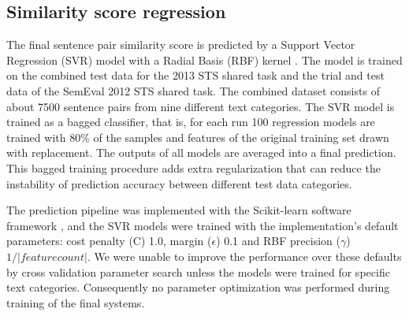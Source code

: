 
\subsection{Similarity score regression}
\label{sec:regression}

The final sentence pair similarity score is predicted by a Support Vector Regression (SVR) model with a Radial Basis (RBF) kernel \cite{VapnikEA:97}. The model is trained on the combined test data for the 2013 STS shared task and the trial and test data of the SemEval 2012 STS shared task. The combined dataset consists of about 7500 sentence pairs from nine different text categories. 
The SVR model is trained as a bagged classifier, that is, for each run 100 regression models are trained with 80\% of the samples and features of the original training set drawn with replacement. The outputs of all models are averaged into a final prediction. 
This bagged training procedure adds extra regularization that can reduce the instability of prediction accuracy between different test data categories. 

The prediction pipeline was implemented with the Scikit-learn software framework \cite{scikit-learn},
and the SVR models were trained with the implementation's default parameters:
cost penalty (C) 1.0, margin ($\epsilon$) 0.1 and RBF precision ($\gamma$) $1/|feature count|$. 
We were unable to improve the performance over these defaults by cross validation parameter search 
unless the models were trained for specific text categories. Consequently no parameter optimization was performed during training of the final systems.

